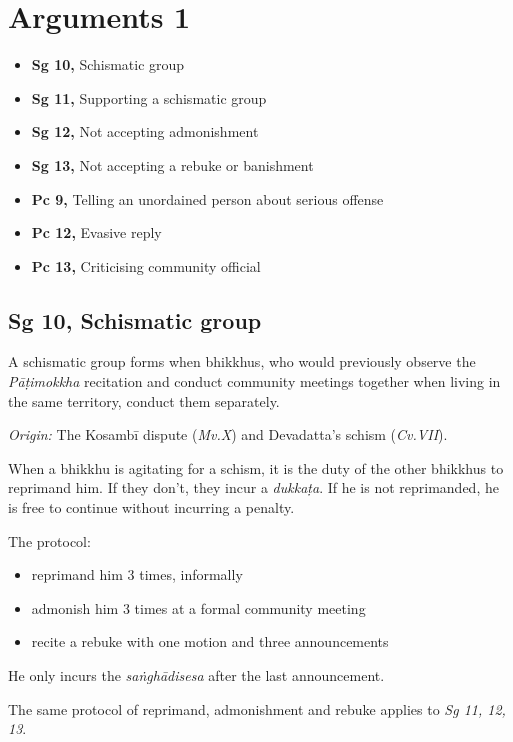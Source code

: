 \chapter{Arguments 1}

\begin{itemize}
\tightlist
\item
  \textbf{Sg 10,} Schismatic group
\item
  \textbf{Sg 11,} Supporting a schismatic group
\item
  \textbf{Sg 12,} Not accepting admonishment
\item
  \textbf{Sg 13,} Not accepting a rebuke or banishment
\item
  \textbf{Pc 9,} Telling an unordained person about serious offense
\item
  \textbf{Pc 12,} Evasive reply
\item
  \textbf{Pc 13,} Criticising community official
\end{itemize}

\section{Sg 10, Schismatic group}

A schismatic group forms when bhikkhus, who would previously observe the
\emph{Pāṭimokkha} recitation and conduct community meetings together
when living in the same territory, conduct them separately.

\emph{Origin:} The Kosambī dispute (\emph{Mv.X}) and Devadatta's schism
(\emph{Cv.VII}).

When a bhikkhu is agitating for a schism, it is the duty of the other
bhikkhus to reprimand him. If they don't, they incur a \emph{dukkaṭa}.
If he is not reprimanded, he is free to continue without incurring a
penalty.

The protocol:

\begin{itemize}
\tightlist
\item
  reprimand him 3 times, informally
\item
  admonish him 3 times at a formal community meeting
\item
  recite a rebuke with one motion and three announcements
\end{itemize}

He only incurs the \emph{saṅghādisesa} after the last announcement.

The same protocol of reprimand, admonishment and rebuke applies to
\emph{Sg 11, 12, 13}.

